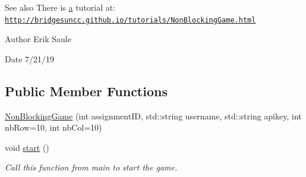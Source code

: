 \begin{DoxySeeAlso}{See also}
There is \mbox{\hyperlink{namespacebridges_1_1game_ab9a19c7ab6e2ebac2f95180e21733487a0cc175b9c0f1b6a831c399e269772661}{a}} tutorial at\+: \href{http://bridgesuncc.github.io/tutorials/NonBlockingGame.html}{\tt http\+://bridgesuncc.\+github.\+io/tutorials/\+Non\+Blocking\+Game.\+html}
\end{DoxySeeAlso}
\begin{DoxyAuthor}{Author}
Erik Saule 
\end{DoxyAuthor}
\begin{DoxyDate}{Date}
7/21/19 
\end{DoxyDate}
\subsection*{Public Member Functions}
\begin{DoxyCompactItemize}
\item 
\mbox{\hyperlink{classbridges_1_1game_1_1_non_blocking_game_a3226aa7e7ff129e916f4bd5aabcb2e72}{Non\+Blocking\+Game}} (int assignment\+ID, std\+::string username, std\+::string apikey, int nb\+Row=10, int nb\+Col=10)
\item 
void \mbox{\hyperlink{classbridges_1_1game_1_1_non_blocking_game_ab48a0d690368bb8ff7b02aad0b6f336e}{start}} ()
\begin{DoxyCompactList}\small\item\em Call this function from main to start the game. \end{DoxyCompactList}\end{DoxyCompactItemize}
